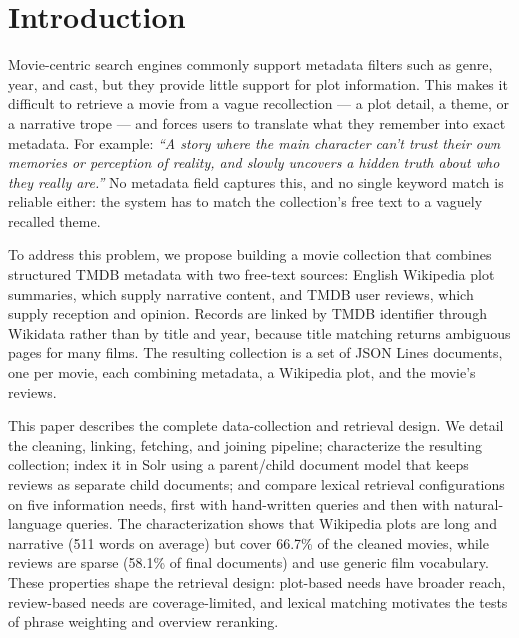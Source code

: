 \documentclass[sigconf]{acmart}
\begin{document}
\maketitle

\section{Introduction}
Movie-centric search engines commonly support metadata filters such as genre, year, and
cast, but they provide little support for plot information. This makes it difficult to
retrieve a movie from a vague recollection --- a plot detail, a theme, or a narrative
trope --- and forces users to translate what they remember into exact metadata. For
example: \textit{``A story where the main character can't trust their own memories or
perception of reality, and slowly uncovers a hidden truth about who they really are.''}
No metadata field captures this, and no single keyword match is reliable either: the
system has to match the collection's free text to a vaguely recalled theme.

To address this problem, we propose building a movie collection that combines structured
TMDB metadata with two free-text sources: English Wikipedia plot summaries, which supply
narrative content, and TMDB user reviews, which supply reception and opinion. Records are
linked by TMDB identifier through Wikidata rather than by title and year, because title
matching returns ambiguous pages for many films. The resulting collection is a set of
JSON Lines documents, one per movie, each combining metadata, a Wikipedia plot, and the
movie's reviews.

This paper describes the complete data-collection and retrieval design. We detail the
cleaning, linking, fetching, and joining pipeline; characterize the resulting collection;
index it in Solr using a parent/child document model that keeps reviews as separate child
documents; and compare lexical retrieval configurations on five information
needs, first with hand-written queries and then with natural-language queries.
The characterization shows
that Wikipedia plots are long and narrative (511 words on average) but cover 66.7\% of
the cleaned movies, while reviews are sparse (58.1\% of final documents) and use generic
film vocabulary. These properties shape the retrieval design: plot-based needs have
broader reach, review-based needs are coverage-limited, and lexical matching motivates
the tests of phrase weighting and overview reranking.
\end{document}

